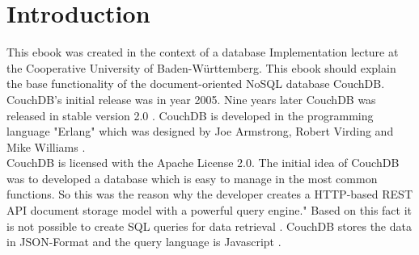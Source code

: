 \section{Introduction}
This ebook was created in the context of a database Implementation lecture at the Cooperative University of Baden-Württemberg. This ebook should explain the base functionality of the document-oriented NoSQL database CouchDB. CouchDB's initial release was in year 2005. Nine years later CouchDB was released in stable version 2.0 \parencite{ApacheSoftwareFoundation.Branch}. CouchDB is developed in the programming language "Erlang" which was designed by	Joe Armstrong, Robert Virding and Mike Williams \parencite{ErlangWikipedia.22.03.2017}.\\
CouchDB is licensed with the Apache License 2.0. The initial idea of CouchDB was to developed a database which is easy to manage in the most common functions. So this was the reason why the developer creates a HTTP-based REST API \parencite{Anderson.2010.Buch} document storage model with a powerful query engine."\parencite{Anderson.2010.Buch} Based on this fact it is not possible to create SQL queries for data retrieval \parencite{Scheliga.2010}.
CouchDB stores the data in JSON-Format and the query language is Javascript \parencite{MarcelWolfKeineKommentare.2016}.
\\
\\


